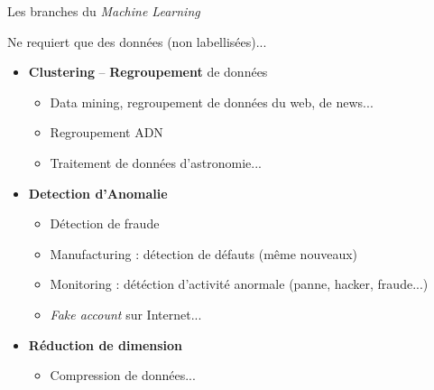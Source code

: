 \documentclass[10pt,serif,mathserif,compress,hyperref={colorlinks}]{beamer}
\begin{document}
\begin{frame}{Les branches du {\em Machine Learning}}
  \begin{tcolorbox}[title={\em Unsupervised learning}\\Apprentissage non-supervisé]
    Ne requiert que des données (non labellisées)...
    \begin{itemize}
    \item \textbf{Clustering} -- \textbf{Regroupement} de données 
      \begin{itemize}
      \item Data mining, regroupement de données du web, de news...
      \item Regroupement ADN
      \item Traitement de données d'astronomie...
      \end{itemize}        
    \item \textbf{Detection d'Anomalie}
      \begin{itemize}
      \item Détection de fraude
      \item Manufacturing : détection de défauts (même nouveaux)
      \item Monitoring : détéction d'activité anormale (panne, hacker, fraude...)
      \item {\em Fake account} sur Internet...
      \end{itemize}
    \item \textbf{Réduction de dimension}
      \begin{itemize}
      \item Compression de données...
      \end{itemize}
    \end{itemize}
  \end{tcolorbox}    
\end{frame}
\end{document}
